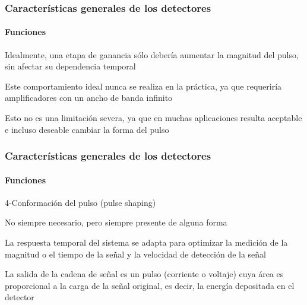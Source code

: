 \documentclass{beamer}
\begin{document}
\begin{frame}
\frametitle{Características generales de los detectores}
\framesubtitle{{\color{blue}Funciones}}
\begin{block}{Idealmente, una etapa de ganancia sólo debería aumentar la magnitud del
pulso, sin afectar su dependencia temporal}

Este comportamiento ideal nunca se realiza en la práctica, ya que
\alert{requeriría amplificadores con un ancho de banda infinito}

\vspace*{10mm}

{\color[rgb]{0,0.26,0.15}Esto no es una limitación severa, ya que en muchas
aplicaciones resulta aceptable e incluso deseable cambiar la forma del pulso}
\end{block}
\end{frame} 

\begin{frame}
\frametitle{Características generales de los detectores}
\framesubtitle{{\color{blue}Funciones}}
\begin{block}{4-Conformación del pulso (pulse shaping)}
\begin{alertblock}{}
No siempre necesario, pero siempre presente de alguna forma
\end{alertblock}
La respuesta temporal del sistema se adapta para \alert{optimizar} la medición
de la {\color{blue}magnitud o el tiempo} de la señal y {\color{blue}la velocidad} de detección
de la señal
\end{block}

\begin{exampleblock}{}
{\color[rgb]{0.5,0,0.13}La salida de la cadena de señal es un pulso (corriente o
voltaje) cuya área es proporcional a la carga de la señal original, es decir, la
energía depositada en el detector}
\end{exampleblock}
\end{frame} 
\end{document}
